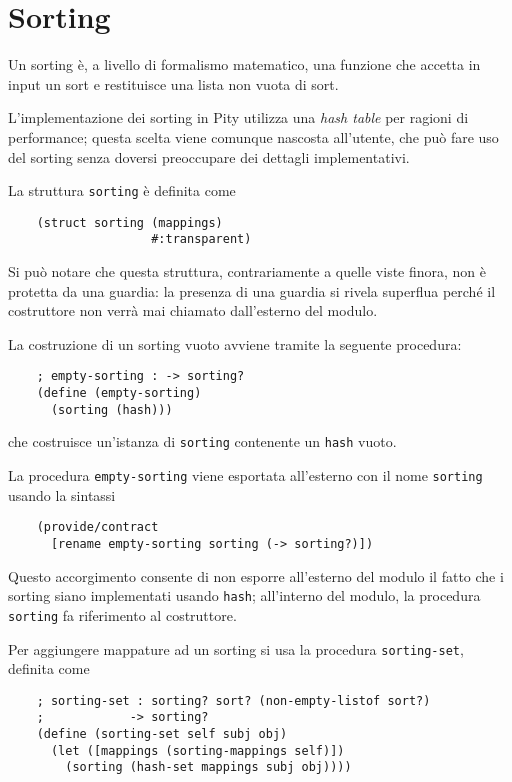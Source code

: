 \section{Sorting}

Un sorting \`e, a livello di formalismo matematico, una funzione che
accetta in input un sort e restituisce una lista non vuota di sort.

L'implementazione dei sorting in Pity utilizza una
\emph{hash table} per ragioni di performance; questa scelta viene
comunque nascosta all'utente, che pu\`o fare uso del sorting senza
doversi preoccupare dei dettagli implementativi.

La struttura \lstinline{sorting} \`e definita come

\begin{lstlisting}
    (struct sorting (mappings)
                    #:transparent)
\end{lstlisting}

Si pu\`o notare che questa struttura, contrariamente a quelle viste
finora, non \`e protetta da una guardia: la presenza di una guardia si
rivela superflua perch\'e il costruttore non verr\`a mai chiamato
dall'esterno del modulo.

La costruzione di un sorting vuoto avviene tramite la seguente procedura:

\begin{lstlisting}
    ; empty-sorting : -> sorting?
    (define (empty-sorting)
      (sorting (hash)))
\end{lstlisting}

che costruisce un'istanza di \lstinline{sorting} contenente un
\lstinline{hash} vuoto.

La procedura \lstinline{empty-sorting} viene esportata all'esterno con
il nome \lstinline{sorting} usando la sintassi

\begin{lstlisting}
    (provide/contract
      [rename empty-sorting sorting (-> sorting?)])
\end{lstlisting}

Questo accorgimento consente di non esporre all'esterno del modulo il
fatto che i sorting siano implementati usando \lstinline{hash};
all'interno del modulo, la procedura \lstinline{sorting} fa riferimento
al costruttore.

Per aggiungere mappature ad un sorting si usa la procedura
\lstinline{sorting-set}, definita come

\begin{lstlisting}
    ; sorting-set : sorting? sort? (non-empty-listof sort?)
    ;            -> sorting?
    (define (sorting-set self subj obj)
      (let ([mappings (sorting-mappings self)])
        (sorting (hash-set mappings subj obj))))
\end{lstlisting}

